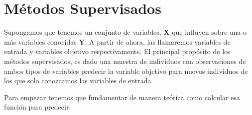 \chapter{Métodos Supervisados}

Supongamos que tenemos un conjunto de variables, $\textbf{X}$ que influyen sobre una o más variables conocidas $\textbf{Y}$. A partir de ahora, las llamaremos variables de entrada y variables objetivo respectivamente. El principal propósito de los métodos supervisados, es dado una muestra de individuos con observaciones de ambos tipos de variables predecir la variable objetivo para nuevos individuos de los que solo conozcamos las variables de entrada  

Para empezar tenemos que fundamentar de manera teórica como calcular esa función para predecir. 

